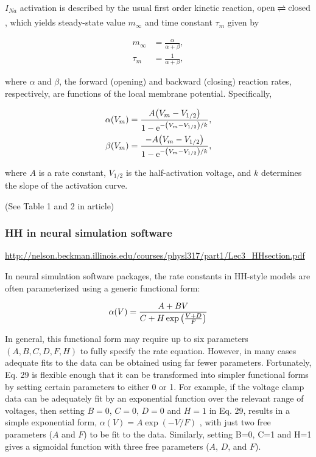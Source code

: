 $I_{Na}$ activation is described by the usual first order kinetic reaction, $\text{open} \xrightleftharpoons[]{} \text{closed}$, which yields steady-state value $m_\infty$ and time constant $\tau_m$ given by 

\begin{align*}
    m_\infty &= \frac{\alpha}{\alpha + \beta}, 
    \\ 
    \tau_m &= \frac{1}{\alpha + \beta},
\end{align*}

where $\alpha$ and $\beta$, the forward (opening) and backward (closing) reaction rates, respectively, are functions of the local membrane potential. Specifically, 

\begin{align*}
    \alpha \qty(V_m) &= \frac{A \qty(V_m - V_{1/2})}{1 - \mathrm{e}^{- \qty(V_m - V_{1/2})/k}},
    \\
    \beta \qty(V_m) &= \frac{-A \qty(V_m - V_{1/2})}{1 - \mathrm{e}^{- \qty(V_m - V_{1/2})/k}},
\end{align*}

where $A$ is a rate constant, $V_{1/2}$ is the half-activation voltage, and $k$ determines the slope of the activation curve. 

(See Table 1 and 2 in article)


\subsubsection{HH in neural simulation software}

\url{http://nelson.beckman.illinois.edu/courses/physl317/part1/Lec3_HHsection.pdf}

In neural simulation software packages, the rate constants in HH-style models are often parameterized using a generic functional form:

\begin{equation*}
    \alpha (V) = \frac{A + BV}{C + H \exp \qty(\frac{V+D}{F})}
\end{equation*}

In general, this functional form may require up to six parameters $(A, B, C, D, F, H)$ to fully specify the rate equation. However, in many cases adequate fits to the data can be obtained using far fewer parameters. Fortunately, Eq. 29 is flexible enough that it can be transformed into simpler functional forms by setting certain parameters to either 0 or 1. For example, if the voltage clamp data can be adequately fit by an exponential function over the relevant range of voltages, then setting $B=0$, $C=0$, $D=0$ and $H=1$ in Eq. 29, results in a simple exponential form,
$\alpha(V) = A \exp(-V / F)$ , with just two free parameters ($A$ and $F$) to be fit to the data. Similarly, setting B=0, C=1 and H=1 gives a sigmoidal function with three free parameters ($A$, $D$, and $F$).


